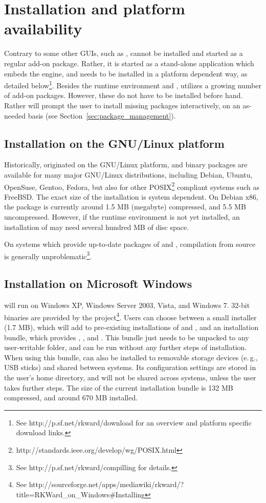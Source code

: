 \section{Installation and platform availability}
\label{sec:installing_starting_RKWard}
Contrary to some other  GUIs, such as ,  cannot be installed and started as a
regular  add-on package. Rather, it is started as a stand-alone application which embeds the
 engine, and needs to be installed in a platform dependent way, as detailed below\footnote{
  See http://p.sf.net/rkward/download for an overview and platform specific download links.
}. Besides the
 runtime environment and ,  utilizes a growing number of  add-on packages.
However, these do not have to be installed before hand. Rather  will prompt the user to install
missing packages interactively, on an as-needed basis (see Section~\ref{sec:package_management}).

\subsection{Installation on the GNU/Linux platform}
Historically,  originated on the GNU/Linux platform, and binary packages are available for many
major GNU/Linux distributions, including Debian, Ubuntu, OpenSuse, Gentoo, Fedora, but also for other POSIX\footnote{
http://standards.ieee.org/develop/wg/POSIX.html
}
compliant systems such as FreeBSD.  The exact size of the installation is system dependent. On Debian x86, the
package is currently around 1.5 MB (megabyte) compressed, and 5.5 MB uncompressed. However, if the 
runtime environment is not yet installed, an installation of  may need several hundred MB of disc
space.

On systems which provide up-to-date packages of  and , compilation from source is
generally unproblematic\footnote{
  See http://p.sf.net/rkward/compilling for details.
}.

\subsection{Installation on Microsoft Windows}
 will run on Windows XP, Windows Server 2003, Vista, and Windows 7. 32-bit binaries are
provided by the project\footnote{
  See http://sourceforge.net/apps/mediawiki/rkward/?title=RKWard\_on\_Windows\#Installing
}. Users can
choose between a small installer (1.7 MB), which will add  to pre-existing installations of
 and , and an installation bundle, which provides , , and
. This bundle just needs to be unpacked to any user-writable folder, and can be run without any
further steps of installation. When using this bundle,  can also be installed to removable storage
devices (e.\,g., USB sticks) and shared between systems. Its configuration settings are stored in the user's
home directory, and will not be shared across systems, unless the user takes further steps. The size of the
current installation bundle is 132 MB compressed, and around 670 MB installed.

